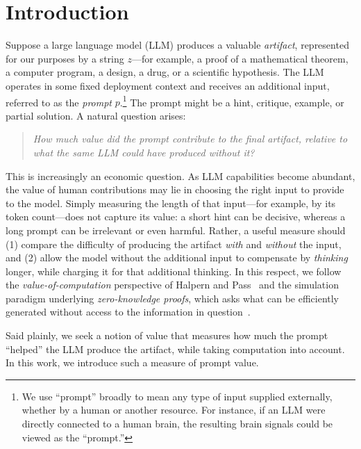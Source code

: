 \documentclass[letterpaper]{article} %
\theoremstyle{definition}
\theoremstyle{remark}
\begin{document}
\section{Introduction}
Suppose a large language model (LLM) produces a valuable \emph{artifact},
represented for our purposes by a string \(z\)---for example, a proof of a
mathematical theorem, a computer program, a design, a drug, or a scientific
hypothesis.  The LLM operates in some fixed deployment context and receives an
additional input, referred to as the \emph{prompt} \(p\).\footnote{We use
``prompt'' broadly to mean any type of input supplied externally, whether by a
human or another resource.  For instance, if an LLM were directly connected to
a human brain, the resulting brain signals could be viewed as the ``prompt.''}
The prompt might be a hint, critique, example, or partial solution.  A natural
question arises:
\begin{quote}
\emph{How much value did the prompt contribute to the final artifact, relative to
what the same LLM could have produced without it?}
\end{quote}

This is increasingly an economic question. As LLM capabilities become
abundant, the value of human contributions may lie in choosing the right input
to provide to the model. Simply measuring the length of that input---for
example, by its token count---does not capture its value: a short hint can be
decisive, whereas a long prompt can be irrelevant or even harmful. Rather, a
useful measure should (1) compare the difficulty of producing the artifact
\emph{with} and \emph{without} the input, and (2) allow the model without the
additional input to compensate by \emph{thinking} longer, while charging it
for that additional thinking. In this respect, we follow the
\emph{value-of-computation} perspective of Halpern and
Pass~\cite{HP11,HP14} and the simulation paradigm underlying
\emph{zero-knowledge proofs}, which asks what can be efficiently generated
without access to the information in question~\cite{GMR}.

Said plainly, we seek a notion of value that measures how much the prompt
``helped'' the LLM produce the artifact, while taking computation into account.
In this work, we introduce such a measure of prompt value.
\end{document}
